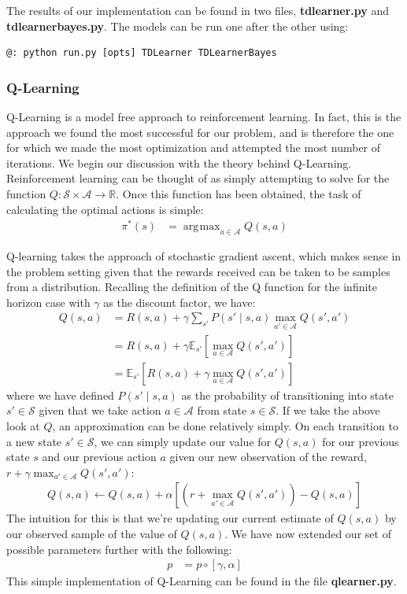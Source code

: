 \documentclass[letterpaper]{article}
\DeclareMathOperator*{\argmax}{\arg\!\max}
\begin{document}
The results of our implementation can be found in two files, \textbf{tdlearner.py} and \textbf{tdlearnerbayes.py}. The models can be run one after the other using:
\begin{verbatim}
@: python run.py [opts] TDLearner TDLearnerBayes
\end{verbatim}

\subsubsection{Q-Learning}
\label{sec:q-learning}
Q-Learning is a model free approach to reinforcement learning. In fact, this is the approach we found the most successful for our problem, and is therefore the one for which we made the most optimization and attempted the most number of iterations. We begin our discussion with the theory behind Q-Learning. Reinforcement learning can be thought of as simply attempting to solve for the function $Q: \mathcal{S} \times \mathcal{A} \to \mathbb{R}$. Once this function has been obtained, the task of calculating the optimal actions is simple:
\begin{align}
\pi^*(s) &= \argmax_{a \in \mathcal{A}} Q(s,a)
\end{align}

Q-learning takes the approach of stochastic gradient ascent, which makes sense in the problem setting given that the rewards received can be taken to be samples from a distribution. Recalling the definition of the Q function for the infinite horizon case with $\gamma$ as the discount factor, we have:
\begin{align}
Q(s,a) &= R(s,a) + \gamma\sum_{s'}P(s' \mid s,a)\max_{a'\in\mathcal{A}} Q(s',a') \\
&= R(s,a) + \gamma \mathbb{E}_{s'}\left[\max_{a\in \mathcal{A}}Q(s',a') \right] \\
&= \mathbb{E}_{s'} \left[R(s,a) + \gamma\max_{a \in \mathcal{A}} Q(s',a') \right]
\end{align}
where we have defined $P(s' \mid s,a)$ as the probability of transitioning into state $s' \in \mathcal{S}$ given that we take action $a \in \mathcal{A}$ from state $s \in \mathcal{S}$. If we take the above look at $Q$, an approximation can be done relatively simply. On each transition to a new state $s' \in \mathcal{S}$, we can simply update our value for $Q(s,a)$ for our previous state $s$ and our previous action $a$ given our new observation of the reward, $r + \gamma \max_{a' \in \mathcal{A}}Q(s',a')$:
\begin{align}
Q(s,a) \leftarrow Q(s,a) + \alpha\left[(r + \max_{a' \in \mathcal{A}}Q(s',a')) - Q(s,a) \right] \label{eq:q_update}
\end{align}
The intuition for this is that we're updating our current estimate of $Q(s,a)$ by our observed sample of the value of $Q(s,a)$. We have now extended our set of possible parameters further with the following:
\begin{align}
p &= p \circ [\gamma, \alpha]
\end{align}
This simple implementation of Q-Learning can be found in the file \textbf{qlearner.py}. 
\end{document}
